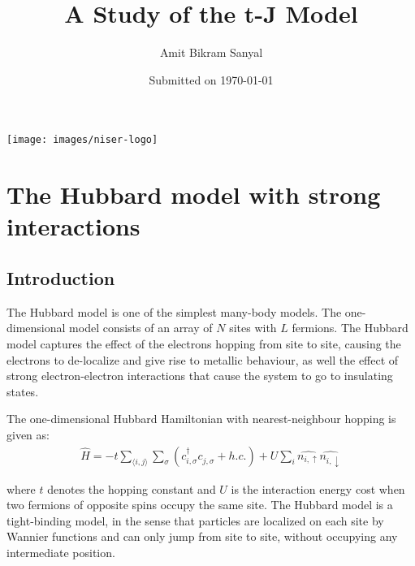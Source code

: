 \documentclass[]{report}
\title{A Study of the t-J Model\vspace{-5mm}}
\author{Amit Bikram Sanyal}
\date{Submitted on \today}
\begin{document}
	
\begin{minipage}{\linewidth}
	\maketitle
\end{minipage}

\vfill

\begin{center}
	\texttt{[image: images/niser-logo]}
\end{center}


\newpage
\tableofcontents
\thispagestyle{empty}

\begin{abstract}
	\lipsum[1]
\end{abstract}

\chapter{The Hubbard model with strong interactions}
\section{Introduction}
The Hubbard model is one of the simplest many-body models. The one-dimensional model consists of an array of $ N $ sites with $ L $ fermions. The Hubbard model captures the effect of the electrons hopping from site to site, causing the electrons to de-localize and give rise to metallic behaviour, as well the effect of strong electron-electron interactions that cause the system to go to insulating states.

The one-dimensional Hubbard Hamiltonian with nearest-neighbour hopping is given as:
\begin{align}
	\hat{H} = -t \sum_{\langle i, j \rangle } \sum_{\sigma} \left( c^{\dagger}_{i, \sigma} c^{}_{j, \sigma} + h.c. \right) + U \sum_{i} \hat{n_{i, \uparrow}} \hat{n_{i, \downarrow}}
\end{align}

where $ t $ denotes the hopping constant and $ U $ is the interaction energy cost when two fermions of opposite spins occupy the same site. The Hubbard model is a tight-binding model, in the sense that particles are localized on each site by Wannier functions and can only jump from site to site, without occupying any intermediate position.
\end{document}
